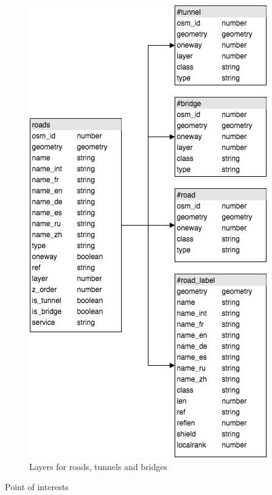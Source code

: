 \begin{figure}[h]
  \centering
  \includegraphics[scale=0.6]{images/road_layer.png}
  \caption{Layers for roads, tunnels and bridges}
\end{figure}

\newpage
Point of interests 

